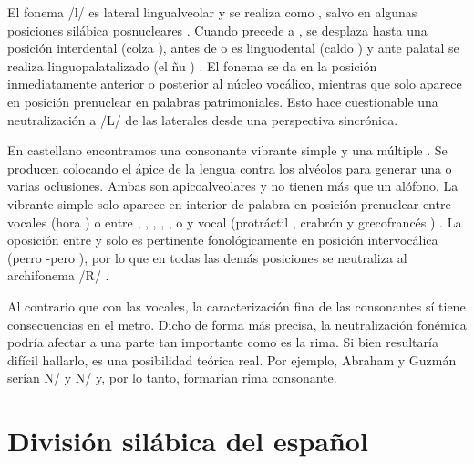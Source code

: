 El fonema /l/ es lateral lingualveolar y se realiza como \ipa{[l]}, salvo en algunas posiciones silábica posnucleares \parencite[309-310]{quilis2019}. Cuando precede a , se desplaza hasta una posición interdental (\textlangle{}colza\textrangle{} \textipa{[ko\textsubplus{l}Ta]}), antes de  o  es linguodental (\textlangle{}caldo\textrangle{} \textipa{[ka\textsubbridge{l}do]}) y ante palatal se realiza linguopalatalizado (\textlangle{}el ñu\textrangle{} ) \parencite[341-250]{clegg2018}. El fonema  se da en la posición inmediatamente anterior o posterior al núcleo vocálico, mientras que  solo aparece en posición prenuclear en palabras patrimoniales. Esto hace cuestionable una neutralización a /L/ de las laterales desde una perspectiva sincrónica.

En castellano encontramos una consonante vibrante simple  y una múltiple . Se producen colocando el ápice de la lengua contra los alvéolos para generar una o varias oclusiones. Ambas son apicoalveolares y no tienen más que un alófono. La vibrante simple solo aparece en interior de palabra en posición prenuclear entre vocales (\textlangle{}hora\textrangle{} ) o entre , , , , ,  o  y vocal (\textlangle{}protráctil\textrangle{} , \textlangle{}crabrón\textrangle{}  y \textlangle{}grecofrancés\textrangle{}  ) \parencite[330]{quilis2019}. La oposición  entre  y   solo es pertinente fonológicamente en posición intervocálica (\textlangle{}perro\textrangle{} -\textlangle{}pero\textrangle{} ), por lo que en todas las demás posiciones se neutraliza al archifonema /R/ \parencite{alarcos1964}.

Al contrario que con las vocales, la caracterización fina de las consonantes sí tiene consecuencias en el metro. Dicho de forma más precisa, la neutralización fonémica podría afectar a una parte tan importante como es la rima. Si bien resultaría difícil hallarlo, es una posibilidad teórica real. Por ejemplo, \textlangle{}Abraham\textrangle{} y \textlangle{}Guzmán\textrangle{} serían N/ y N/ y, por lo tanto, formarían rima consonante.

\section{División silábica del español}\label{sec:silabas}
